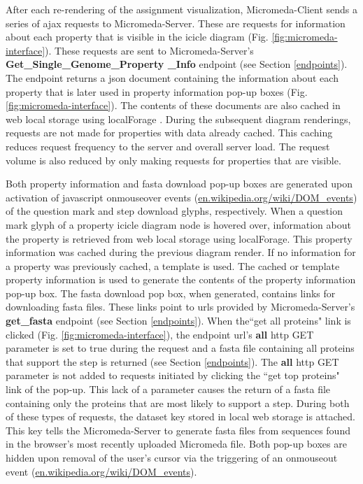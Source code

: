 After each re-rendering of the assignment visualization, Micromeda-Client sends 
a series of \gls{ajax}  requests to Micromeda-Server. These are requests for 
information about each property that is visible in the icicle diagram (Fig. 
\ref{fig:micromeda-interface}). These requests are sent to Micromeda-Server's 
\textbf{Get\_Single\_Genome\_Property \_Info} endpoint (see Section 
\ref{endpoints}). The endpoint returns a \gls{json} document 
containing the information about each property that is later used in property 
information pop-up boxes (Fig. \ref{fig:micromeda-interface}). The contents of 
these documents are also cached in web local storage using localForage 
\cite{localforage}. During the subsequent diagram renderings, requests are not 
made for properties with data already cached. This caching reduces request 
frequency to the server and overall server load. The request volume is also 
reduced by only making requests for properties that are visible.

Both property information and \gls{fasta} download pop-up boxes are generated upon 
activation of \gls{javascript} onmouseover events \cite{dom-events} 
(\href{http://en.wikipedia.org/wiki/DOM_events}{en.wikipedia.org/wiki/DOM\_events}) 
of the question mark and step download glyphs, respectively. When a question 
mark glyph of a property icicle diagram node is hovered over, information about 
the property is retrieved from web local storage using localForage. This 
property information was cached during the previous diagram render. If no 
information for a property was previously cached, a template is used. The cached 
or template property information is used to generate the contents of the 
property information pop-up box. The \gls{fasta} download pop box, when generated, 
contains links for downloading \gls{fasta} files. These links point to \gls{url}s 
provided by Micromeda-Server's \textbf{get\_fasta} endpoint (see Section 
\ref{endpoints}). When the``get all proteins" link is clicked (Fig. 
\ref{fig:micromeda-interface}), the endpoint \gls{url}'s \textbf{all} \gls{http} 
GET parameter is set to true during the request and a \gls{fasta} file containing all 
proteins that support the step is returned (see Section 
\ref{endpoints}). The \textbf{all} \gls{http} GET parameter is not 
added to requests initiated by clicking the ``get top proteins" link of the 
pop-up. This lack of a parameter causes the return of a \gls{fasta} file containing 
only the proteins that are most likely to support a step. During both of these 
types of requests, the dataset key stored in local web storage is attached. This 
key tells the Micromeda-Server to generate \gls{fasta} files from sequences found in 
the browser's most recently uploaded Micromeda file. Both pop-up boxes are hidden 
upon removal of the user's cursor via the triggering of an onmouseout event 
\cite{dom-events} 
(\href{http://en.wikipedia.org/wiki/DOM_events}{en.wikipedia.org/wiki/DOM\_events}).

